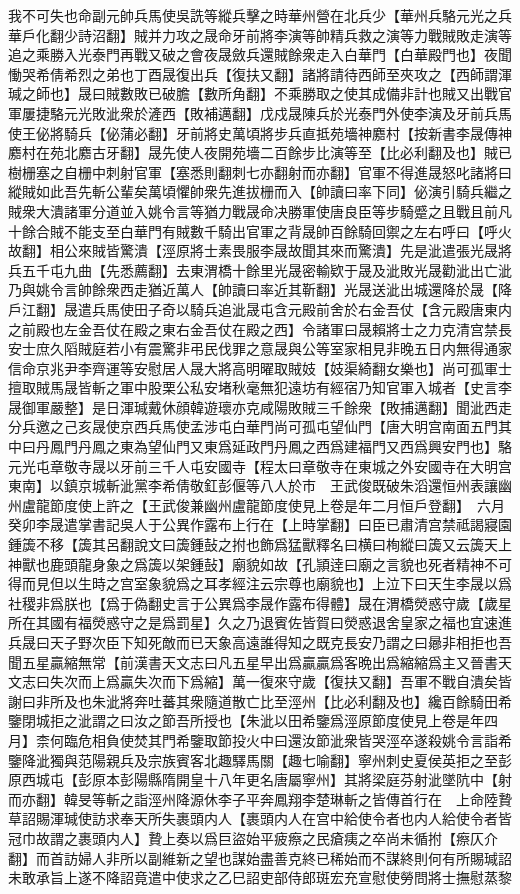 我不可失也命副元帥兵馬使吳詵等縱兵擊之時華州營在北兵少【華州兵駱元光之兵華戶化翻少詩沼翻】賊并力攻之晟命牙前將李演等帥精兵救之演等力戰賊敗走演等追之乘勝入光泰門再戰又破之會夜晟斂兵還賊餘衆走入白華門【白華殿門也】夜聞慟哭希倩希烈之弟也丁酉晟復出兵【復扶又翻】諸將請待西師至夾攻之【西師謂渾瑊之師也】晟曰賊數敗已破膽【數所角翻】不乘勝取之使其成備非計也賊又出戰官軍屢捷駱元光敗泚衆於滻西【敗補邁翻】戊戍晟陳兵於光泰門外使李演及牙前兵馬使王佖將騎兵【佖蒲必翻】牙前將史萬頃將步兵直抵苑墻神䴥村【按新書李晟傳神䴥村在苑北䴥古牙翻】晟先使人夜開苑墻二百餘步比演等至【比必利翻及也】賊已樹栅塞之自栅中刺射官軍【塞悉則翻刺七亦翻射而亦翻】官軍不得進晟怒叱諸將曰縱賊如此吾先斬公輩矣萬頃懼帥衆先進拔栅而入【帥讀曰率下同】佖演引騎兵繼之賊衆大潰諸軍分道並入姚令言等猶力戰晟命决勝軍使唐良臣等步騎蹙之且戰且前凡十餘合賊不能支至白華門有賊數千騎出官軍之背晟帥百餘騎回禦之左右呼曰【呼火故翻】相公來賊皆驚潰【涇原將士素畏服李晟故聞其來而驚潰】先是泚遣張光晟將兵五千屯九曲【先悉薦翻】去東渭橋十餘里光晟密輸欵于晟及泚敗光晟勸泚出亡泚乃與姚令言帥餘衆西走猶近萬人【帥讀曰率近其靳翻】光晟送泚出城還降於晟【降戶江翻】晟遣兵馬使田子奇以騎兵追泚晟屯含元殿前舍於右金吾仗【含元殿唐東内之前殿也左金吾仗在殿之東右金吾仗在殿之西】令諸軍曰晟賴將士之力克清宫禁長安士庶久䧟賊庭若小有震驚非弔民伐罪之意晟與公等室家相見非晚五日内無得通家信命京兆尹李齊運等安慰居人晟大將高明曜取賊妓【妓渠綺翻女樂也】尚可孤軍士擅取賊馬晟皆斬之軍中股栗公私安堵秋毫無犯遠坊有經宿乃知官軍入城者【史言李晟御軍嚴整】是日渾瑊戴休顔韓遊瓌亦克咸陽敗賊三千餘衆【敗捕邁翻】聞泚西走分兵邀之己亥晟使京西兵馬使孟涉屯白華門尚可孤屯望仙門【唐大明宫南面五門其中曰丹鳳門丹鳳之東為望仙門又東爲延政門丹鳳之西爲建福門又西爲興安門也】駱元光屯章敬寺晟以牙前三千人屯安國寺【程太曰章敬寺在東城之外安國寺在大明宫東南】以鎮京城斬泚黨李希倩敬釭彭偃等八人於市　王武俊既破朱滔還恒州表讓幽州盧龍節度使上許之【王武俊兼幽州盧龍節度使見上卷是年二月恒戶登翻】　六月癸卯李晟遣掌書記吳人于公異作露布上行在【上時掌翻】曰臣已肅清宫禁祗謁寢園鍾簴不移【簴其呂翻說文曰簴鍾鼔之拊也飾爲猛獸釋名曰横曰栒縱曰簴又云簴天上神獸也鹿頭龍身象之爲簴以架鍾鼔】廟貌如故【孔頴逹曰廟之言貌也死者精神不可得而見但以生時之宫室象貌爲之耳孝經注云宗尊也廟貌也】上泣下曰天生李晟以爲社稷非爲朕也【爲于偽翻史言于公異爲李晟作露布得體】晟在渭橋熒惑守歲【歲星所在其國有福熒惑守之是爲罰星】久之乃退賓佐皆賀曰熒惑退舍皇家之福也宜速進兵晟曰天子野次臣下知死敵而已天象高遠誰得知之既克長安乃謂之曰曏非相拒也吾聞五星贏縮無常【前漢書天文志曰凡五星早出爲贏贏爲客晩出爲縮縮爲主又晉書天文志曰失次而上爲贏失次而下爲縮】萬一復來守歲【復扶又翻】吾軍不戰自潰矣皆謝曰非所及也朱泚將奔吐蕃其衆隨道散亡比至涇州【比必利翻及也】纔百餘騎田希鑒閉城拒之泚謂之曰汝之節吾所授也【朱泚以田希鑒爲涇原節度使見上卷是年四月】柰何臨危相負使焚其門希鑒取節投火中曰還汝節泚衆皆哭涇卒遂殺姚令言詣希鑒降泚獨與范陽親兵及宗族賓客北趣驛馬關【趣七喻翻】寧州刺史夏侯英拒之至彭原西城屯【彭原本彭陽縣隋開皇十八年更名唐屬寧州】其將梁庭芬射泚墜阬中【射而亦翻】韓旻等斬之詣涇州降源休李子平奔鳳翔李楚琳斬之皆傳首行在　上命陸贄草詔賜渾瑊使訪求奉天所失裹頭内人【裹頭内人在宫中給使令者也内人給使令者皆冠巾故謂之裹頭内人】贄上奏以爲巨盜始平疲瘵之民瘡痍之卒尚未循拊【瘵仄介翻】而首訪婦人非所以副維新之望也謀始盡善克終已稀始而不謀終則何有所賜瑊詔未敢承旨上遂不降詔竟遣中使求之乙巳詔吏部侍郎斑宏充宣慰使勞問將士撫慰蒸黎